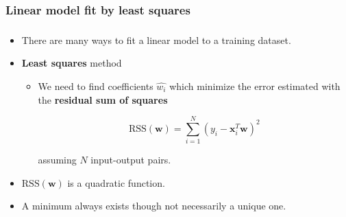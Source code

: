 \documentclass[notes]{beamer}          %
\newcommand{\vect}[1]{\bm{#1}}
\newif\iffull
\begin{document}
\iffull
\begin{frame}
\frametitle{Linear model fit by least squares}
    Some hyper(space) terminology:
    \begin{itemize}
        \item Points $\vect{x},\hat{y}$ form a {\bf hyperplane} in the $(p+1)$-dimensional input-output hyperspace.
        \item If $\vect{x}$ is extended with constant $1$ then the hyperplane includes the origin and it forms a {\bf subspace}.
        \item If $1$ is not included then the hyperplane is an {\bf affine} set and it cuts the $y$-axis at the point $(\vect{0}, \hat{w_0})$, where the vector $\vect{0}$ has all $x_i$ coordinates equal to $0$.
        \item Reminder: from now on we assume that $1$ is included in $\vect{x}$ and $\hat{w_0}$ in $\hat{\vect{w}}$/
        \item The function $f(\vect{x}) =  \vect{w}^T \vect{x}$ defined on the $p$-dimensional (input) space is a {\bf linear} function (we omit the hats over the $w$s since now we consider them as free variables).
        \item The gradient $\nabla f(\vect{x})$ is a vector pointing along the direction of maximal change.
    \end{itemize}
\end{frame}
\fi

\begin{frame}
\frametitle{Linear model fit by least squares}
\frametitle{}
    \begin{itemize}
        \item There are many ways to fit a linear model to a training dataset.
        \item {\bf Least squares} method
            \begin{itemize}
                \item We need to find coefficients $\hat{w_i}$ which minimize the error estimated with the {\bf residual sum of squares}
                \begin{center}
                    $$\mbox{RSS}(\vect{w}) = \sum_{i = 1}^{N}(y_i - \vect{x}_i^T \vect{w})^2$$
                \end{center}
                 assuming $N$ input-output pairs.
            \end{itemize}
        \item $\mbox{RSS}(\vect{w})$ is a quadratic function.
        \item A minimum always exists though not necessarily a unique one.
    \end{itemize}

\end{frame}
\end{document}
